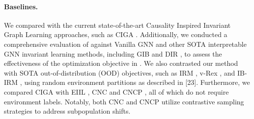 
\paragraph{Baselines.} We compared \ours with the current state-of-the-art Causality Inspired Invariant Graph Learning approaches, such as CIGA \citep{ciga}. Additionally, we conducted a comprehensive evaluation of \ours against Vanilla GNN and other SOTA interpretable GNN invariant learning methods, including GIB \citep{gib} and DIR \citep{dir}, to assess the effectiveness of the optimization objective in \ours. We also contrasted our method with SOTA out-of-distribution (OOD) objectives, such as IRM \citep{irmv1}, v-Rex \citep{v-rex}, and IB-IRM \citep{ib-irm}, using random environment partitions as described in [23]. Furthermore, we compared CIGA with EIIL \citep{eiil}, CNC and CNCP \citep{cnc}, all of which do not require environment labels. Notably, both CNC and CNCP utilize contrastive sampling strategies to address subpopulation shifts.

